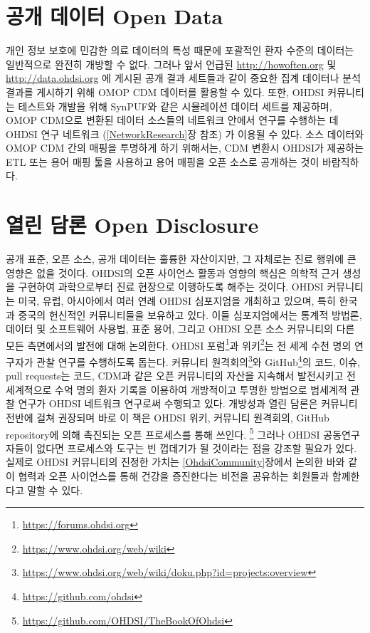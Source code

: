 \documentclass[10.5pt]{book}
\let\rmarkdownfootnote\footnote%
\def\footnote{\protect\rmarkdownfootnote}
\theoremstyle{definition}
\theoremstyle{definition}
\theoremstyle{definition}
\theoremstyle{remark}
\begin{document}
\section{공개 데이터 Open Data}\label{--open-data}


개인 정보 보호에 민감한 의료 데이터의 특성 때문에 포괄적인 환자 수준의
데이터는 일반적으로 완전히 개방할 수 없다. 그러나 앞서 언급된
\url{http://howoften.org} 및 \url{http://data.ohdsi.org} 에 게시된 공개
결과 세트들과 같이 중요한 집계 데이터나 분석 결과를 게시하기 위해 OMOP
CDM 데이터를 활용할 수 있다. 또한, OHDSI 커뮤니티는 테스트와 개발을 위해
SynPUF와 같은 시뮬레이션 데이터 세트를 제공하며, OMOP CDM으로 변환된
데이터 소스들의 네트워크 안에서 연구를 수행하는 데 OHDSI 연구 네트워크
(\ref{NetworkResearch}장 참조) 가 이용될 수 있다. 소스 데이터와 OMOP CDM
간의 매핑을 투명하게 하기 위해서는, CDM 변환시 OHDSI가 제공하는 ETL 또는
용어 매핑 툴을 사용하고 용어 매핑을 오픈 소스로 공개하는 것이
바람직하다.

\section{열린 담론 Open Disclosure}\label{--open-disclosure}


공개 표준, 오픈 소스, 공개 데이터는 훌륭한 자산이지만, 그 자체로는 진료
행위에 큰 영향은 없을 것이다. OHDSI의 오픈 사이언스 활동과 영향의 핵심은
의학적 근거 생성을 구현하여 과학으로부터 진료 현장으로 이행하도록 해주는
것이다. OHDSI 커뮤니티는 미국, 유럽, 아시아에서 여러 연례 OHDSI
심포지엄을 개최하고 있으며, 특히 한국과 중국의 헌신적인 커뮤니티들을
보유하고 있다. 이들 심포지엄에서는 통계적 방법론, 데이터 및 소프트웨어
사용법, 표준 용어, 그리고 OHDSI 오픈 소스 커뮤니티의 다른 모든
측면에서의 발전에 대해 논의한다. OHDSI 포럼\footnote{\url{https://forums.ohdsi.org}}과
위키\footnote{\url{https://www.ohdsi.org/web/wiki}}는 전 세계 수천 명의
연구자가 관찰 연구를 수행하도록 돕는다. 커뮤니티 원격회의\footnote{\url{https://www.ohdsi.org/web/wiki/doku.php?id=projects:overview}}와
GitHub\footnote{\url{https://github.com/ohdsi}}의 코드, 이슈, pull
requests는 코드, CDM과 같은 오픈 커뮤니티의 자산을 지속해서 발전시키고
전 세계적으로 수억 명의 환자 기록을 이용하여 개방적이고 투명한 방법으로
범세계적 관찰 연구가 OHDSI 네트워크 연구로써 수행되고 있다. 개방성과
열린 담론은 커뮤니티 전반에 걸쳐 권장되며 바로 이 책은 OHDSI 위키,
커뮤니티 원격회의, GitHub repository에 의해 촉진되는 오픈 프로세스를
통해 쓰인다. \footnote{\url{https://github.com/OHDSI/TheBookOfOhdsi}}
그러나 OHDSI 공동연구자들이 없다면 프로세스와 도구는 빈 껍데기가 될
것이라는 점을 강조할 필요가 있다. 실제로 OHDSI 커뮤니티의 진정한 가치는
\ref{OhdsiCommunity}장에서 논의한 바와 같이 협력과 오픈 사이언스를 통해
건강을 증진한다는 비전을 공유하는 회원들과 함께한다고 말할 수 있다.
\end{document}
